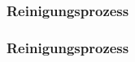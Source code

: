 \documentclass[ngerman]{beamer}
\begin{document}
\begin{frame}[fragile]
\frametitle{Reinigungsprozess}

\begin{center}
\end{center}

\end{frame}

\begin{frame}[fragile]
\frametitle{Reinigungsprozess}

\begin{center}
\end{center}

\end{frame}
\end{document}
